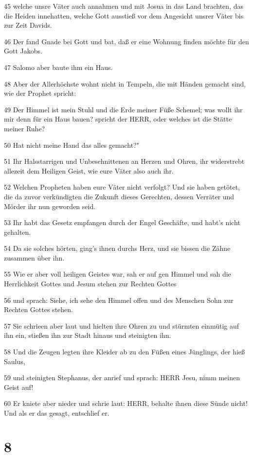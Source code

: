\par 45 welche unsre Väter auch annahmen und mit Josua in das Land brachten, das die Heiden innehatten, welche Gott ausstieß vor dem Angesicht unsrer Väter bis zur Zeit Davids.
\par 46 Der fand Gnade bei Gott und bat, daß er eine Wohnung finden möchte für den Gott Jakobs.
\par 47 Salomo aber baute ihm ein Haus.
\par 48 Aber der Allerhöchste wohnt nicht in Tempeln, die mit Händen gemacht sind, wie der Prophet spricht:
\par 49 Der Himmel ist mein Stuhl und die Erde meiner Füße Schemel; was wollt ihr mir denn für ein Haus bauen? spricht der HERR, oder welches ist die Stätte meiner Ruhe?
\par 50 Hat nicht meine Hand das alles gemacht?"
\par 51 Ihr Halsstarrigen und Unbeschnittenen an Herzen und Ohren, ihr widerstrebt allezeit dem Heiligen Geist, wie eure Väter also auch ihr.
\par 52 Welchen Propheten haben eure Väter nicht verfolgt? Und sie haben getötet, die da zuvor verkündigten die Zukunft dieses Gerechten, dessen Verräter und Mörder ihr nun geworden seid.
\par 53 Ihr habt das Gesetz empfangen durch der Engel Geschäfte, und habt's nicht gehalten.
\par 54 Da sie solches hörten, ging's ihnen durchs Herz, und sie bissen die Zähne zusammen über ihn.
\par 55 Wie er aber voll heiligen Geistes war, sah er auf gen Himmel und sah die Herrlichkeit Gottes und Jesum stehen zur Rechten Gottes
\par 56 und sprach: Siehe, ich sehe den Himmel offen und des Menschen Sohn zur Rechten Gottes stehen.
\par 57 Sie schrieen aber laut und hielten ihre Ohren zu und stürmten einmütig auf ihn ein, stießen ihn zur Stadt hinaus und steinigten ihn.
\par 58 Und die Zeugen legten ihre Kleider ab zu den Füßen eines Jünglings, der hieß Saulus,
\par 59 und steinigten Stephanus, der anrief und sprach: HERR Jesu, nimm meinen Geist auf!
\par 60 Er kniete aber nieder und schrie laut: HERR, behalte ihnen diese Sünde nicht! Und als er das gesagt, entschlief er.

\chapter{8}


